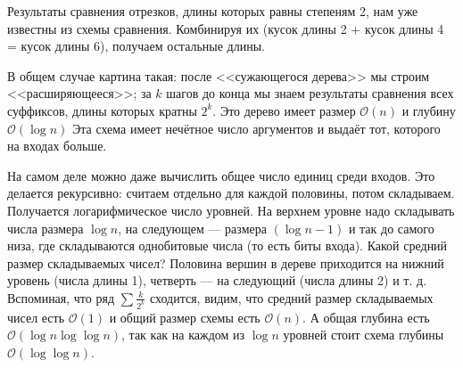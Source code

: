Результаты сравнения отрезков, длины которых равны степеням 2, нам уже известны из схемы сравнения.
Комбинируя их (кусок длины 2 + кусок длины 4 = кусок длины 6), получаем остальные длины.

В общем случае картина такая: после <<сужающегося дерева>> мы строим <<расширяющееся>>; 
за $k$ шагов до конца мы знаем результаты сравнения всех суффиксов, длины которых кратны $2^k$. 
Это дерево имеет размер $\mathcal{O}(n)$ и глубину $\mathcal{O}(\log n)$
Эта схема имеет нечётное число аргументов и выдаёт тот, которого на входах больше.

На самом деле можно даже вычислить общее число единиц среди входов. 
Это делается рекурсивно: считаем отдельно для каждой половины, потом складываем. 
Получается логарифмическое число уровней. 
На верхнем уровне надо складывать числа размера $\log n$, на следующем — размера $(\log n -1)$ и так до самого низа, где складываются однобитовые числа (то есть биты входа). 
Какой средний размер складываемых чисел? 
Половина вершин в дереве приходится на нижний уровень (числа длины 1), четверть — на следующий (числа длины 2) и т. д. 
Вспоминая, что ряд $\sum \frac{k}{2^k}$ сходится, видим, что средний размер складываемых чисел есть $\mathcal{O}(1)$ и общий размер схемы есть $\mathcal{O}(n)$. 
А общая глубина есть $\mathcal{O}(\log n \log\log n)$, так как на каждом из $\log n$ уровней стоит схема глубины $\mathcal{O}(\log\log n)$.
